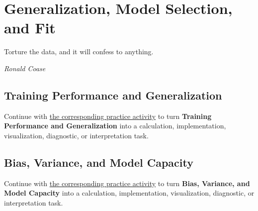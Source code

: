 \documentclass[
  letterpaper,
]{scrbook}
\begin{document}
\chapter{Generalization, Model Selection, and
Fit}\label{ch-generalization}

Torture the data, and it will confess to anything.

\emph{Ronald Coase}

\section{Training Performance and
Generalization}\label{training-performance-and-generalization}

\begin{tcolorbox}[enhanced jigsaw, arc=.35mm, bottomrule=.15mm, bottomtitle=1mm, breakable, colback=white, colbacktitle=quarto-callout-tip-color!10!white, colframe=quarto-callout-tip-color-frame, coltitle=black, left=2mm, leftrule=.75mm, opacityback=0, opacitybacktitle=0.6, rightrule=.15mm, title=\textcolor{quarto-callout-tip-color}{\faLightbulb}\hspace{0.5em}{Put it into practice}, titlerule=0mm, toprule=.15mm, toptitle=1mm]

Continue with
\hyperref[sec-pr-15-training-performance-and-generalization]{the
corresponding practice activity} to turn \textbf{Training Performance
and Generalization} into a calculation, implementation, visualization,
diagnostic, or interpretation task.

\end{tcolorbox}

\section{Bias, Variance, and Model
Capacity}\label{bias-variance-and-model-capacity}

\begin{tcolorbox}[enhanced jigsaw, arc=.35mm, bottomrule=.15mm, bottomtitle=1mm, breakable, colback=white, colbacktitle=quarto-callout-tip-color!10!white, colframe=quarto-callout-tip-color-frame, coltitle=black, left=2mm, leftrule=.75mm, opacityback=0, opacitybacktitle=0.6, rightrule=.15mm, title=\textcolor{quarto-callout-tip-color}{\faLightbulb}\hspace{0.5em}{Put it into practice}, titlerule=0mm, toprule=.15mm, toptitle=1mm]

Continue with \hyperref[sec-pr-15-bias-variance-and-model-capacity]{the
corresponding practice activity} to turn \textbf{Bias, Variance, and
Model Capacity} into a calculation, implementation, visualization,
diagnostic, or interpretation task.

\end{tcolorbox}
\end{document}
